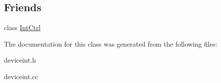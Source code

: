 \subsection*{Friends}
\begin{DoxyCompactItemize}
\item 
\hypertarget{classDeviceInt_aa29a2d47613fcc0b21d2babf280a2c7f}{
class \hyperlink{classDeviceInt_aa29a2d47613fcc0b21d2babf280a2c7f}{IntCtrl}}
\label{classDeviceInt_aa29a2d47613fcc0b21d2babf280a2c7f}

\end{DoxyCompactItemize}


The documentation for this class was generated from the following files:\begin{DoxyCompactItemize}
\item 
deviceint.h\item 
deviceint.cc\end{DoxyCompactItemize}

